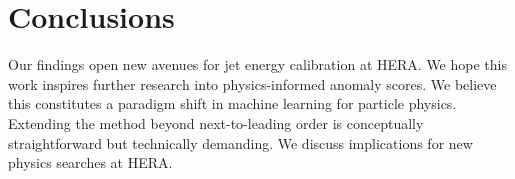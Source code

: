 \section{Conclusions}\label{sec:conclusions}

Our findings open new avenues for jet energy calibration at HERA. We
hope this work inspires further research into physics-informed anomaly
scores. We believe this constitutes a paradigm shift in machine learning
for particle physics. Extending the method beyond next-to-leading order
is conceptually straightforward but technically demanding. We discuss
implications for new physics searches at HERA.

